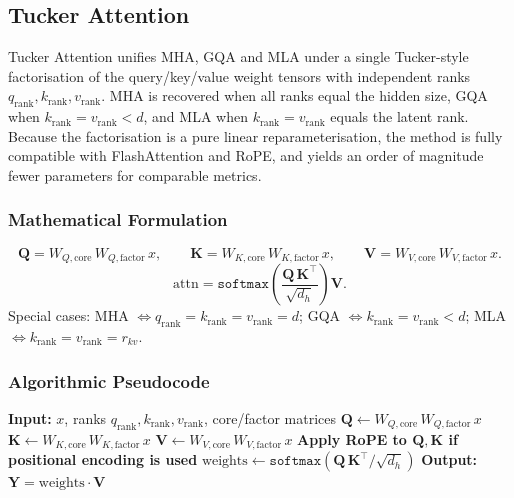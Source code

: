 \subsection{Tucker Attention}
Tucker Attention \citep{klein_tucker_2026} unifies MHA, GQA and MLA under a single Tucker-style factorisation of the query/key/value weight tensors with independent ranks $q_{\text{rank}}, k_{\text{rank}}, v_{\text{rank}}$. MHA is recovered when all ranks equal the hidden size, GQA when $k_{\text{rank}} = v_{\text{rank}} < d$, and MLA when $k_{\text{rank}} = v_{\text{rank}}$ equals the latent rank. Because the factorisation is a pure linear reparameterisation, the method is fully compatible with FlashAttention and RoPE, and yields an order of magnitude fewer parameters for comparable metrics.

\subsubsection{Mathematical Formulation}
\[
\mathbf{Q} = W_{Q,\text{core}}\, W_{Q,\text{factor}}\, x, \qquad
\mathbf{K} = W_{K,\text{core}}\, W_{K,\text{factor}}\, x, \qquad
\mathbf{V} = W_{V,\text{core}}\, W_{V,\text{factor}}\, x.
\]
\[
\text{attn} = \texttt{softmax}\!\left(\frac{\mathbf{Q}\, \mathbf{K}^\top}{\sqrt{d_h}}\right) \mathbf{V}.
\]
Special cases: MHA $\Leftrightarrow q_{\text{rank}} = k_{\text{rank}} = v_{\text{rank}} = d$; GQA $\Leftrightarrow k_{\text{rank}} = v_{\text{rank}} < d$; MLA $\Leftrightarrow k_{\text{rank}} = v_{\text{rank}} = r_{kv}$.

\subsubsection{Algorithmic Pseudocode}
\begin{algorithmic}[1]
\State \textbf{Input:} $x$, ranks $q_{\text{rank}}, k_{\text{rank}}, v_{\text{rank}}$, core/factor matrices
\State $\mathbf{Q} \gets W_{Q,\text{core}}\, W_{Q,\text{factor}}\, x$ 
\State $\mathbf{K} \gets W_{K,\text{core}}\, W_{K,\text{factor}}\, x$ 
\State $\mathbf{V} \gets W_{V,\text{core}}\, W_{V,\text{factor}}\, x$ 
\State \textbf{Apply RoPE to $\mathbf{Q}, \mathbf{K}$ if positional encoding is used}
\State $\text{weights} \gets \texttt{softmax}(\mathbf{Q}\, \mathbf{K}^\top / \sqrt{d_h})$ 
\State \textbf{Output:} $\mathbf{Y} = \text{weights} \cdot \mathbf{V}$
\end{algorithmic}

